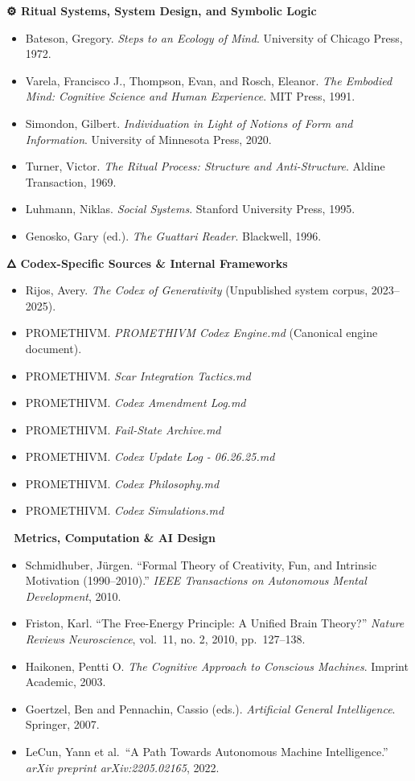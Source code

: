 \textbf{⚙️ Ritual Systems, System Design, and Symbolic Logic}

\begin{itemize}
\tightlist
\item
  Bateson, Gregory. \emph{Steps to an Ecology of Mind}. University of
  Chicago Press, 1972.
\item
  Varela, Francisco J., Thompson, Evan, and Rosch, Eleanor. \emph{The
  Embodied Mind: Cognitive Science and Human Experience}. MIT Press,
  1991.
\item
  Simondon, Gilbert. \emph{Individuation in Light of Notions of Form and
  Information}. University of Minnesota Press, 2020.
\item
  Turner, Victor. \emph{The Ritual Process: Structure and
  Anti-Structure}. Aldine Transaction, 1969.
\item
  Luhmann, Niklas. \emph{Social Systems}. Stanford University Press,
  1995.
\item
  Genosko, Gary (ed.). \emph{The Guattari Reader}. Blackwell, 1996.
\end{itemize}

\textbf{🜂 Codex-Specific Sources \& Internal Frameworks}

\begin{itemize}
\tightlist
\item
  Rijos, Avery. \emph{The Codex of Generativity} (Unpublished system
  corpus, 2023--2025).
\item
  PROMETHIVM. \emph{PROMETHIVM Codex Engine.md} (Canonical engine
  document).
\item
  PROMETHIVM. \emph{Scar Integration Tactics.md}
\item
  PROMETHIVM. \emph{Codex Amendment Log.md}
\item
  PROMETHIVM. \emph{Fail-State Archive.md}
\item
  PROMETHIVM. \emph{Codex Update Log - 06.26.25.md}
\item
  PROMETHIVM. \emph{Codex Philosophy.md}
\item
  PROMETHIVM. \emph{Codex Simulations.md}
\end{itemize}

\textbf{📐 Metrics, Computation \& AI Design}

\begin{itemize}
\tightlist
\item
  Schmidhuber, Jürgen. ``Formal Theory of Creativity, Fun, and Intrinsic
  Motivation (1990--2010).'' \emph{IEEE Transactions on Autonomous
  Mental Development}, 2010.
\item
  Friston, Karl. ``The Free-Energy Principle: A Unified Brain Theory?''
  \emph{Nature Reviews Neuroscience}, vol.~11, no. 2, 2010,
  pp.~127--138.
\item
  Haikonen, Pentti O. \emph{The Cognitive Approach to Conscious
  Machines}. Imprint Academic, 2003.
\item
  Goertzel, Ben and Pennachin, Cassio (eds.). \emph{Artificial General
  Intelligence}. Springer, 2007.
\item
  LeCun, Yann et al.~``A Path Towards Autonomous Machine Intelligence.''
  \emph{arXiv preprint arXiv:2205.02165}, 2022.
\end{itemize}

